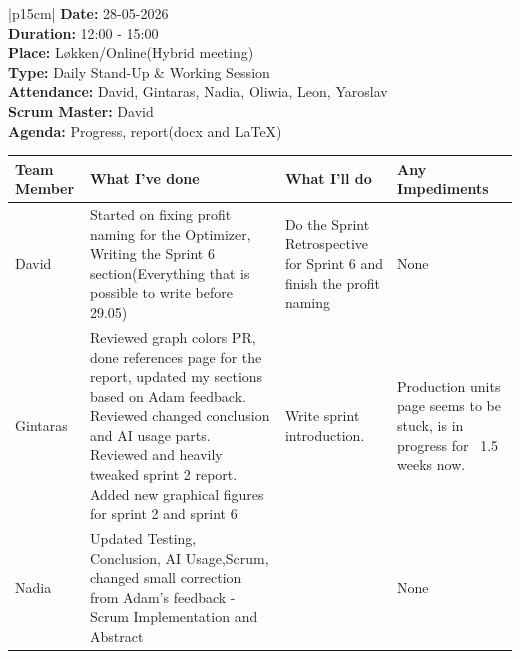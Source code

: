 \begin{table}[H]
    \centering
    \begin{tabular}{|p{15cm}|}   
        \hline
        \textbf{Date:}  28-05-2026 \\
        \textbf{Duration:}  12:00 - 15:00 \\
        \textbf{Place:}  Løkken/Online(Hybrid meeting) \\
        \textbf{Type:} Daily Stand-Up \& Working Session \\
        \textbf{Attendance:} David, Gintaras, Nadia, Oliwia, Leon, Yaroslav  \\
        \textbf{Scrum Master:}  David \\
        \textbf{Agenda:} Progress, report(docx and LaTeX)
        \begin{table}[H]
            \begin{tabular}{|p{1.75cm}|p{4cm}|p{4cm}|p{4cm}|}
                \hline
                \cellcolor[HTML]{BFBFBF}  \textbf{Team Member} & \cellcolor[HTML]{BFBFBF}  \textbf{What I've done} & \cellcolor[HTML]{BFBFBF}  \textbf{What I'll do} & \cellcolor[HTML]{BFBFBF}  \textbf{Any Impediments}\\
                \hline
                \cellcolor[HTML]{d4d4d4} David & Started on fixing profit naming for the Optimizer, Writing the Sprint 6 section(Everything that is possible to write before 29.05) & Do the Sprint Retrospective for Sprint 6 and finish the profit naming & None \\
                \hline
                \cellcolor[HTML]{d4d4d4} Gintaras & Reviewed graph colors PR, done references page for the report, updated my sections based on Adam feedback. Reviewed changed conclusion and AI usage parts. Reviewed and heavily tweaked sprint 2 report. Added new graphical figures for sprint 2 and sprint 6 & Write sprint introduction. & Production units page seems to be stuck, is in progress for ~1.5 weeks now. \\
                \hline
                \cellcolor[HTML]{d4d4d4} Nadia & Updated Testing, Conclusion, AI Usage,Scrum, changed small correction from Adam’s feedback - Scrum Implementation and Abstract &  & None \\
                \hline
            \end{tabular}
        \end{table} \\
        \hline
    \end{tabular}
\end{table}

